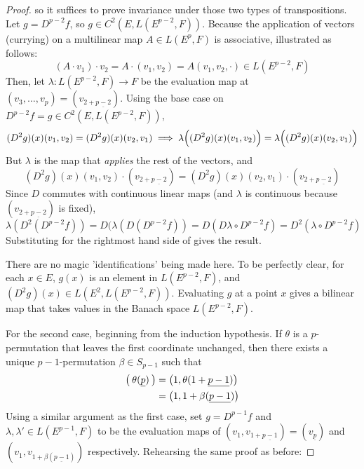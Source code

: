 \documentclass[../main-v2-manifolds.tex]{subfiles}
\begin{document}
\begin{proof}
    so it suffices to prove invariance under those two types of transpositions. Let $g = D^{p-2}f$, so $g\in C^2(E, L(E^{p-2}, F))$. Because the application of vectors (currying) on a multilinear map $A\in L(E^p, F)$ is associative, illustrated as follows:
    \[
       (A\cdot v_1)\cdot v_2 = A\cdot (v_1,v_2) = A(v_1, v_2,\cdot)\in L(E^{p-2}, F)
    \]
    Then, let $\lambda: L(E^{p-2}, F)\to F$ be the evaluation map at $(v_3,\ldots, v_p) = (v_{2+\underline{p-2}})$. 
    Using the base case on $D^{p-2}f = g\in C^2(E, L(E^{p-2}, F))$, 
    \[
        (D^2g)(x)(v_1,v_2) = (D^2g)(x)(v_2,v_1)\implies \lambda\qty\Big((D^2g)(x)(v_1,v_2)) = \lambda\qty\Big((D^2g)(x)(v_2,v_1))
    \]
    But $\lambda$ is the map that \emph{applies} the rest of the vectors, and
    \begin{equation}\label{second-derivative-D2g-equality}
        (D^2g)(x)(v_1,v_2)\cdot (v_{2+\underline{p-2}}) = (D^2g)(x)(v_2,v_1)\cdot (v_{2+\underline{p-2}})
    \end{equation}
    Since $D$ commutes with continuous linear maps (and $\lambda$ is continuous because $(v_{2+\underline{p-2}})$ is fixed),
    \begin{equation}\label{second-derivative-application-map-lambda-commute}
       \lambda(D^2(D^{p-2}f)) = D(\lambda(D(D^{p-2}f)) = D(D\lambda\circ D^{p-2}f) = D^2(\lambda\circ D^{p-2}f) 
    \end{equation}
    Substituting  for the rightmost hand side of  gives the result.
    \begin{note}
        There are no magic 'identifications' being made here. To be perfectly clear, for each $x\in E$, $g(x)$ is an element in $L(E^{p-2}, F)$, and $(D^2g)(x)\in L(E^2, L(E^{p-2}, F))$. Evaluating $g$ at a point $x$ gives a bilinear map that takes values in the Banach space $L(E^{p-2}, F)$.
    \end{note}
    For the second case, beginning from the induction hypothesis. If $\theta$ is a $p$-permutation that leaves the first coordinate unchanged, then there exists a unique $p-1$-permutation $\beta\in S_{p-1}$ such that
    \begin{align}\label{multi-derivatives-theta-def}
    \qty\big(\:\theta(\underline{p})\:) &= \qty\big(1,\theta(1+\underline{p-1}))\nonumber\\
    &= \qty\big(1,1+\beta(\underline{p-1}))    
    \end{align}
    Using a similar argument as the first case, set $g = D^{p-1}f$ and $\lambda, \lambda' \in L(E^{p-1}, F)$ to be the evaluation maps of $(v_1, v_{1+\underline{p-1}}) = (v_{\underline{p}})$ and $(v_1, v_{1+\beta(\underline{p-1})})$ respectively. Rehearsing the same proof as before:

\end{proof}
\end{document}
